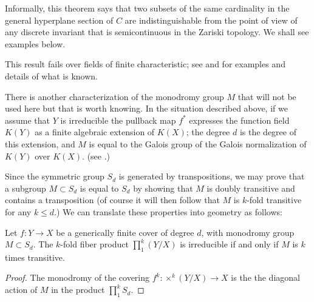Informally, this theorem says that two subsets of the same cardinality in the general hyperplane section of $C$
are indistinguishable from the point of view of any discrete invariant that is semicontinuous in the Zariski topology. We shall see examples below.

This result fails over fields of finite characteristic; see \cite{Rathmann} and \cite{Kadets} for examples and details of what is known. 

\begin{fact}
There is another characterization of the monodromy group $M$ that will not be used here but that is worth knowing. In the situation described above, if we assume that $Y$ is irreducible the pullback map $f^*$ expresses the function field $K(Y)$ as a finite algebraic extension of $K(X)$; the degree $d$ is the degree of this extension, and $M$ is equal to the Galois group of the Galois normalization of $K(Y)$ over $K(X)$. (see \cite{Harris1979}.)
\end{fact}

Since the symmetric group $S_d$ is generated by transpositions, we may prove that a subgroup $M\subset S_d$ is equal to $S_d$ by showing that $M$ is doubly transitive and contains a transposition (of course it will then follow that $M$ is $k$-fold transitive for any $k\leq d$.) We can translate these properties into geometry as follows:

\begin{lemma}\label{transitivity lemma}
Let $f : Y \to X$ be a generically finite cover of degree $d$, with  monodromy group $M \subset S_d$.
The $k$-fold fiber product $\prod_1^k(Y/X)$ is irreducible if and only if $M$ is $k$ times transitive.
\end{lemma}

\begin{proof}
The monodromy of the covering $f^k: \times^k(Y/X) \to X$ is the the diagonal action of
$M$ in the product $\prod_1^k S_d$.
\end{proof}

